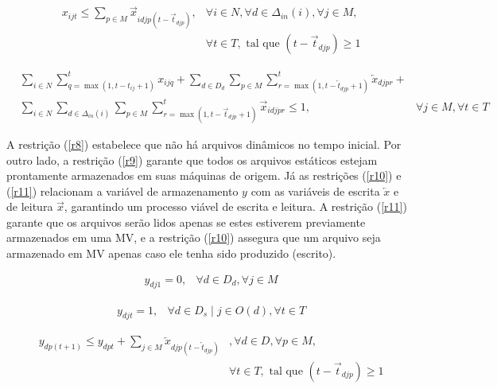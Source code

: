 \begin{align}
& x_{ijt} \leq \sum_{p \in M} \overrightarrow{x}_{idjp(t-\overrightarrow{t}_{djp})} , &\forall i \in N, \forall d \in \Delta_{in}(i), \forall j \in M,\nonumber\\
&& \forall t \in T, \mbox{ tal que }  (t-\overrightarrow{t}_{djp})\geq 1 \label{r5}
\end{align}

\begin{align}
& \sum_{i \in N} \sum_{q=\max{(1,t-t_{ij}+1)}}^t x_{ijq} +  \sum_{d \in D_d} \sum_{p \in M} \sum_{r=\max{(1,t-  \overleftarrow{t}_{djp}+1)}}^t \overleftarrow{x}_{djpr} + &   \nonumber\\
& \sum_{i \in N} \sum_{d \in \Delta_{in}(i)} \sum_{p \in M} \sum_{r=\max{(1,t-  \overrightarrow{t}_{djp}+1)}}^t \overrightarrow{x}_{idjpr} \leq 1 , & \forall j \in M, \forall t \in T  \label{r7}
\end{align}


A restrição (\ref{r8}) estabelece que não há arquivos dinâmicos no tempo inicial. Por outro lado, a restrição (\ref{r9}) garante que todos os arquivos estáticos estejam prontamente armazenados em suas máquinas de origem. Já as restrições (\ref{r10}) e (\ref{r11}) relacionam a variável de armazenamento $y$ com as variáveis de escrita $\overleftarrow{x}$ e de leitura $\overrightarrow{x}$, garantindo um processo viável de escrita e leitura. A restrição (\ref{r11}) garante que os arquivos serão lidos apenas se estes estiverem previamente armazenados em uma MV, e a restrição (\ref{r10}) assegura que um arquivo seja armazenado em MV apenas caso ele tenha sido produzido (escrito).



\begin{align}
& y_{dj1} =0, & \forall d \in D_d, \forall j \in M \label{r8}
\end{align}

\begin{align}
& y_{djt} =1, & \forall d \in D_s \mid j \in O(d), \forall t \in T \label{r9}
\end{align}

\begin{align}
& y_{dp(t+1)} \leq y_{dpt} + \sum_{j \in M} \overleftarrow{x}_{djp(t-\overleftarrow{t}_{djp})} &, \forall d \in D, \forall p \in M, \nonumber\\
&&\forall t \in T, \mbox{ tal que } (t-\overrightarrow{t}_{djp}) \geq 1 \label{r10} 
\end{align}



